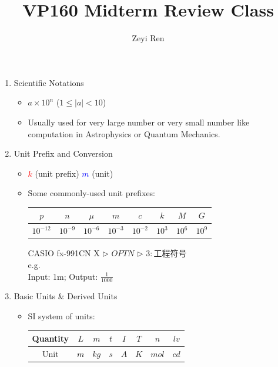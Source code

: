 \documentclass{beamer}
\title{VP160 Midterm Review Class}
\author{Zeyi Ren}
\institute{UM-SJTU Joint Institute}
\begin{document}
\maketitle

\begin{frame}
  \begin{enumerate}[1.]
    \item Scientific Notations
    \begin{itemize}
      \item $ a\times 10^n$ ($1\leq |a| < 10$)
      \item Usually used for very large number or very small number like computation in Astrophysics or Quantum Mechanics.
    \end{itemize}\pause
    \item Unit Prefix and Conversion
    \begin{itemize}
      \item \textcolor{red}{$k$} (unit prefix) \textcolor{blue}{$m$} (unit)
      \item Some commonly-used unit prefixes:\\ 
      \begin{table}[H]
        \begin{tabular}{c|c|c|c|c|c|c|c}
        \hline
        $p$        & $n$       & $\mu$     & $m$       & $c$       & $k$      & $M$      & $G$      \\ \hline
        $10^{-12}$ & $10^{-9}$ & $10^{-6}$ & $10^{-3}$ & $10^{-2}$ & $10^{3}$ & $10^{6}$ & $10^{9}$ \\ \hline
        \end{tabular}
        \end{table}
        
        CASIO fx-991CN X $\rhd$ $\boxed{OPTN}$ $\rhd$ $3:$工程符号\\
        e.g.\\Input: 1m; Output: $\frac{1}{1000}$
    \end{itemize}\pause
    \item Basic Units \& Derived Units
    \begin{itemize}
      \item SI system of units: 
      \begin{table}[H]
        \begin{tabular}{c|c|c|c|c|c|c|c}
        \hline
        Quantity & $L$        & $m$       & $t$       & $I$       & $T$       & $n$      & $lv$     \\ \hline
        Unit     & \textcolor{black}{$m$} & $kg$& $s$ & $A$ & $K$ & $mol$ & $cd$ \\ \hline
        \end{tabular}
        \end{table}
    \end{itemize}
  \end{enumerate}
\end{frame}
\end{document}
